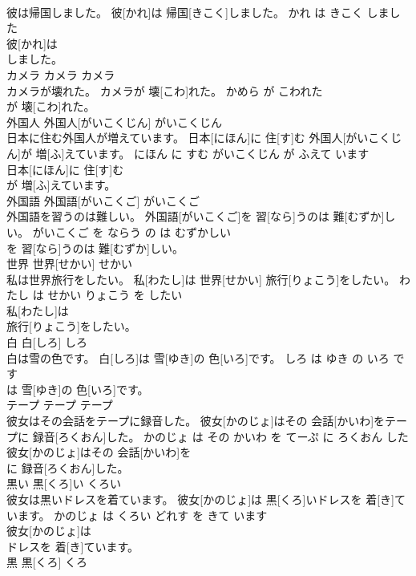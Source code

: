 \documentclass[8pt]{extreport}
\begin{document}
\begin{CJK}{UTF8}{min}
\\	彼は帰国しました。	彼[かれ]は 帰国[きこく]しました。	かれ は きこく しました	
\\	彼[かれ]は
\\	しました。			
\\	カメラ	カメラ	カメラ	
\\	カメラが壊れた。	カメラが 壊[こわ]れた。	かめら が こわれた	
\\	が 壊[こわ]れた。			
\\	外国人	外国人[がいこくじん]	がいこくじん	
\\	日本に住む外国人が増えています。	日本[にほん]に 住[す]む 外国人[がいこくじん]が 増[ふ]えています。	にほん に すむ がいこくじん が ふえて います	
\\	日本[にほん]に 住[す]む
\\	が 増[ふ]えています。			
\\	外国語	外国語[がいこくご]	がいこくご	
\\	外国語を習うのは難しい。	外国語[がいこくご]を 習[なら]うのは 難[むずか]しい。	がいこくご を ならう の は むずかしい	
\\	を 習[なら]うのは 難[むずか]しい。			
\\	世界	世界[せかい]	せかい	
\\	私は世界旅行をしたい。	私[わたし]は 世界[せかい] 旅行[りょこう]をしたい。	わたし は せかい りょこう を したい	
\\	私[わたし]は
\\	旅行[りょこう]をしたい。			
\\	白	白[しろ]	しろ	
\\	白は雪の色です。	白[しろ]は 雪[ゆき]の 色[いろ]です。	しろ は ゆき の いろ です	
\\	は 雪[ゆき]の 色[いろ]です。			
\\	テープ	テープ	テープ	
\\	彼女はその会話をテープに録音した。	彼女[かのじょ]はその 会話[かいわ]をテープに 録音[ろくおん]した。	かのじょ は その かいわ を てーぷ に ろくおん した	
\\	彼女[かのじょ]はその 会話[かいわ]を
\\	に 録音[ろくおん]した。			
\\	黒い	黒[くろ]い	くろい	
\\	彼女は黒いドレスを着ています。	彼女[かのじょ]は 黒[くろ]いドレスを 着[き]ています。	かのじょ は くろい どれす を きて います	
\\	彼女[かのじょ]は
\\	ドレスを 着[き]ています。			
\\	黒	黒[くろ]	くろ	

\end{CJK}
\end{document}
